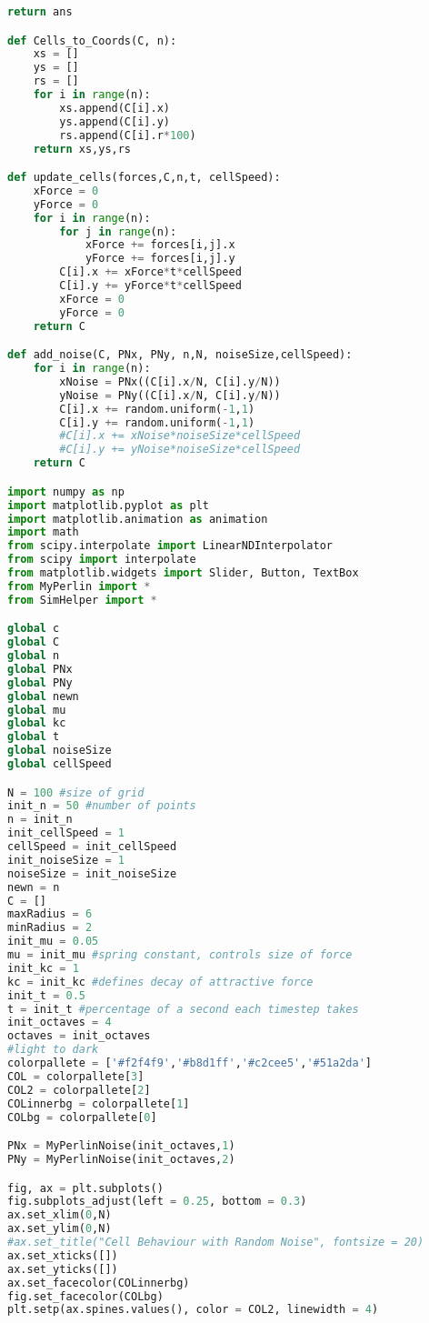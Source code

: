 \documentclass[11pt,a4paper]{article}
\begin{document}
\begin{lstlisting}[language=Python, mathescape=true]
    return ans

def Cells_to_Coords(C, n):
    xs = []
    ys = []
    rs = []
    for i in range(n):
        xs.append(C[i].x)
        ys.append(C[i].y)
        rs.append(C[i].r*100)
    return xs,ys,rs

def update_cells(forces,C,n,t, cellSpeed):
    xForce = 0
    yForce = 0
    for i in range(n):
        for j in range(n):
            xForce += forces[i,j].x
            yForce += forces[i,j].y
        C[i].x += xForce*t*cellSpeed
        C[i].y += yForce*t*cellSpeed
        xForce = 0
        yForce = 0
    return C

def add_noise(C, PNx, PNy, n,N, noiseSize,cellSpeed):
    for i in range(n):
        xNoise = PNx((C[i].x/N, C[i].y/N))
        yNoise = PNy((C[i].x/N, C[i].y/N))
        C[i].x += random.uniform(-1,1)
        C[i].y += random.uniform(-1,1)
        #C[i].x += xNoise*noiseSize*cellSpeed
        #C[i].y += yNoise*noiseSize*cellSpeed
    return C

import numpy as np
import matplotlib.pyplot as plt
import matplotlib.animation as animation
import math
from scipy.interpolate import LinearNDInterpolator
from scipy import interpolate
from matplotlib.widgets import Slider, Button, TextBox
from MyPerlin import *
from SimHelper import *

global c
global C
global n
global PNx
global PNy
global newn
global mu
global kc
global t
global noiseSize
global cellSpeed

N = 100 #size of grid
init_n = 50 #number of points
n = init_n
init_cellSpeed = 1
cellSpeed = init_cellSpeed
init_noiseSize = 1
noiseSize = init_noiseSize
newn = n
C = []
maxRadius = 6
minRadius = 2
init_mu = 0.05
mu = init_mu #spring constant, controls size of force
init_kc = 1
kc = init_kc #defines decay of attractive force
init_t = 0.5
t = init_t #percentage of a second each timestep takes
init_octaves = 4
octaves = init_octaves
#light to dark
colorpallete = ['#f2f4f9','#b8d1ff','#c2cee5','#51a2da']
COL = colorpallete[3]
COL2 = colorpallete[2]
COLinnerbg = colorpallete[1]
COLbg = colorpallete[0]

PNx = MyPerlinNoise(init_octaves,1)
PNy = MyPerlinNoise(init_octaves,2)

fig, ax = plt.subplots()
fig.subplots_adjust(left = 0.25, bottom = 0.3)
ax.set_xlim(0,N)
ax.set_ylim(0,N)
#ax.set_title("Cell Behaviour with Random Noise", fontsize = 20)
ax.set_xticks([])
ax.set_yticks([])
ax.set_facecolor(COLinnerbg)
fig.set_facecolor(COLbg)
plt.setp(ax.spines.values(), color = COL2, linewidth = 4)



\end{lstlisting}
\end{document}
